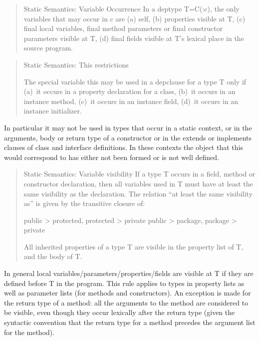 \begin{quotation}
{\sc Static Semantics: Variable Occurrence}
  In a deptype T=C(:c), the only variables that may occur in c are (a)
  self, (b) properties visible at T, (c) final local variables, final
  method parameters or final constructor parameters visible at T, (d)
  final fields visible at T's lexical place in the source program.  
\end{quotation}

\begin{quotation}
{\sc Static Semantics: This restrictions}

  The special variable {\cf this} may be used in a depclause for a type {\cf T}
  only if (a)~it occurs in a property declaration for a class, (b)~it
  occurs in an instance method, (c)~it occurs in an instance field, (d)~it
  occurs in an instance initializer.
\end{quotation}

In particular it may not be used in types that occur in a static
context, or in the arguments, body or return type of a constructor or
in the extends or implements clauses of class and interface
definitions.  In these contexts the object that {\cf this} would
correspond to has either not been formed or is not well defined.

\begin{quotation}
{\sc Static Semantics: Variable visibility}
  If a type {\cf T} occurs in a field, method or constructor
  declaration, then all variables used in {\cf T} must have at least the
  same visibility as the declaration.  The relation ``at least the same
  visibility as'' is given by the transitive closure of:

  \begin{x10}
public > protected, protected > private
public > package, package > private
  \end{x10}

All inherited properties of a type {\cf T} are visible in the property
list of {\cf T}, and the body of {\cf T}.

\end{quotation}

In general local variables/parameters/properties/fields are visible at
{\cf T} if they are defined before {\cf T} in the program. This rule applies to
types in property lists as well as parameter lists (for methods and
constructors).  An exception is made for the return type of a method:
all the arguments to the method are considered to be visible, even
though they occur lexically after the return type (given the \Java{}
syntactic convention that the return type for a method precedes the
argument list for the method).

